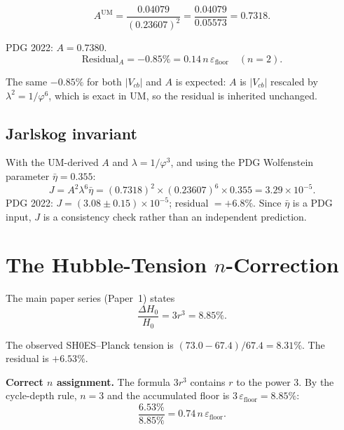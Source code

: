 \documentclass[12pt]{article}
\begin{document}
\begin{equation}
  A^{\text{UM}} = \frac{0.04079}{(0.23607)^2}
               = \frac{0.04079}{0.05573}
               = 0.7318.
\end{equation}

PDG 2022: $A = 0.7380$.
\begin{equation}
  \text{Residual}_{A} = -0.85\%
  = 0.14\,n\,\varepsilon_{\text{floor}} \quad (n = 2).
\end{equation}

The same $-0.85\%$ for both $|V_{cb}|$ and $A$ is expected: $A$ is
$|V_{cb}|$ rescaled by $\lambda^2 = 1/\varphi^6$, which is exact in
UM, so the residual is inherited unchanged.

\subsection{Jarlskog invariant}

With the UM-derived $A$ and $\lambda = 1/\varphi^3$, and using the
PDG Wolfenstein parameter $\bar\eta = 0.355$:
\begin{equation}
  J = A^2\lambda^6\bar\eta
    = (0.7318)^2 \times (0.23607)^6 \times 0.355
    = 3.29 \times 10^{-5}.
\end{equation}
PDG 2022: $J = (3.08 \pm 0.15)\times 10^{-5}$; residual $= +6.8\%$.
Since $\bar\eta$ is a PDG input, $J$ is a consistency check rather
than an independent prediction.

\section{The Hubble-Tension $n$-Correction}

The main paper series (Paper~1) states
\begin{equation}
  \frac{\Delta H_0}{H_0} = 3r^3 = 8.85\%.
\end{equation}

The observed SH0ES–Planck tension is $(73.0 - 67.4)/67.4 = 8.31\%$.
The residual is $+6.53\%$.

\medskip
\textbf{Correct $n$ assignment.} The formula $3r^3$ contains $r$ to
the power 3.  By the cycle-depth rule, $n = 3$ and the accumulated
floor is $3\,\varepsilon_{\text{floor}} = 8.85\%$:
\begin{equation}
  \frac{6.53\%}{8.85\%} = 0.74\,n\,\varepsilon_{\text{floor}}.
\end{equation}
\end{document}
